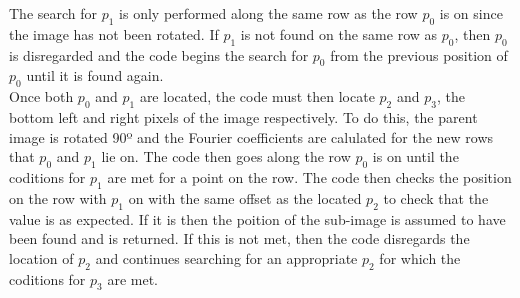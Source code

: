 \documentclass[twocolumn,twoside]{article}
\numberwithin{equation}{section}
\begin{document}
The search for $p_1$ is only performed along the same row as the row $p_0$ is on since the image has not been rotated. If $p_1$ is not found on the same row as $p_0$, then $p_0$ is disregarded and the code begins the search for $p_0$ from the previous position of $p_0$ until it is found again.\\

Once both $p_0$ and $p_1$ are located, the code must then locate $p_2$ and $p_3$, the bottom left and right pixels of the image respectively. To do this, the parent image is rotated 90º and the Fourier coefficients are calulated for the new rows that $p_0$ and $p_1$ lie on. The code then goes along the row $p_0$ is on until the coditions for $p_1$ are met for a point on the row. The code then checks the position on the row with $p_1$ on with the same offset as the located $p_2$ to check that the value is as expected. If it is then the poition of the sub-image is assumed to have been found and is returned. If this is not met, then the code disregards the location of $p_2$ and continues searching for an appropriate $p_2$ for which the coditions for $p_3$ are met.
\end{document}
